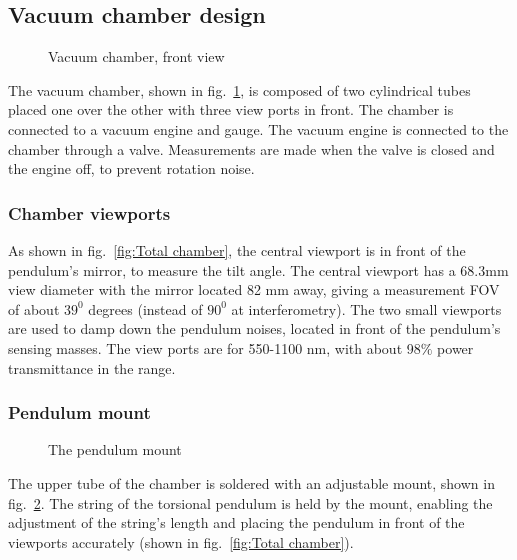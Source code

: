 \documentclass[\main/master.tex]{subfiles}
\begin{document}
\subsection{Vacuum chamber design}
\begin{figure}[htbp]
	\centering
	\caption[Vacuum chamber, front view]{Vacuum chamber, front view}
	\label{fig:chamber front}
\end{figure}
\FloatBarrier

\par\noindent
The vacuum chamber, shown in fig.~\ref{fig:chamber front}, is composed of two cylindrical tubes placed one over the other with three view ports in front. The chamber is connected to a vacuum engine and gauge. The vacuum engine is connected to the chamber through a valve. Measurements are made when the valve is closed and the engine off, to prevent rotation noise.

\subsubsection{Chamber viewports}
\par\noindent
As shown in fig.~\ref{fig:Total chamber}, the central viewport is in front of the pendulum's mirror, to measure the tilt angle. The central viewport has a 68.3mm view diameter with the mirror located 82 mm away, giving a measurement FOV of about $39^0$ degrees (instead of $90^0$ at interferometry). The two small viewports are used to damp down the pendulum noises, located in front of the pendulum's sensing masses. The view ports are for 550-1100 nm, with about 98$\%$ power transmittance in the range. 

\subsubsection{Pendulum mount}
\begin{figure}[htbp]
	\centering
	\caption[The pendulum mount]{The pendulum mount}
	\label{fig:mount}
\end{figure}
\FloatBarrier
\par\noindent
The upper tube of the chamber is soldered with an adjustable mount, shown in fig.~\ref{fig:mount}. The string of the torsional pendulum is held by the mount, enabling the adjustment of the string's length and placing the pendulum in front of the viewports accurately (shown in fig.~\ref{fig:Total chamber}). 
\end{document}
